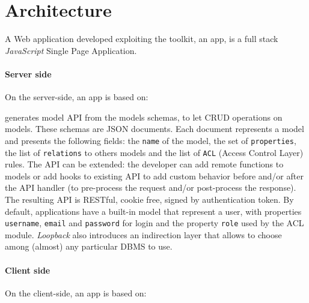 \section{Architecture}\label{sec:architecture}

A Web application developed exploiting the  toolkit, an  app, is a full stack {\em JavaScript} Single Page Application.

\paragraph{Server side}

On the server-side, an  app is based on:

\begin{description}
\itemsep1pt\parskip0pt
\item[StrongLoop LoopBack] generates model API from the models schemas, to let CRUD operations on models.
These schemas are JSON documents. Each document represents a model and presents the following fields: the \texttt{name} of the model, the set of \texttt{properties}, the list of \texttt{relations} to others models and the list of \texttt{ACL} (Access Control Layer) rules. 
The API can be extended: the developer can add remote functions to models or add hooks to existing API to add custom behavior before and/or after the API handler (to pre-process the request and/or post-process the response). 
The resulting API is RESTful, cookie free, signed by authentication token.
By default, applications have a built-in model that represent a user, with properties \texttt{username}, \texttt{email} and \texttt{password} for login and the property \texttt{role} used by the ACL module.
{\em Loopback} also introduces an indirection layer that allows to choose among (almost) any particular DBMS to use.
\end{description}

\paragraph{Client side}

On the client-side, an  app is based on:

